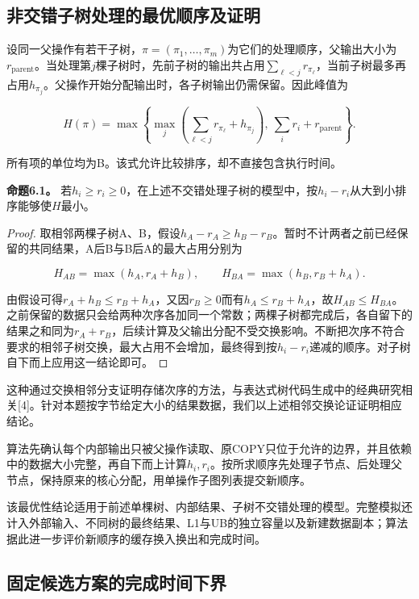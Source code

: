 \documentclass[anonymous,notoc]{gmcm2026}
\begin{document}
\subsection{非交错子树处理的最优顺序及证明}

设同一父操作有若干子树，\(\pi=(\pi_1,\ldots,\pi_m)\)为它们的处理顺序，父输出大小为\(r_{\mathrm{parent}}\)。当处理第\(j\)棵子树时，先前子树的输出共占用\(\sum_{\ell<j}r_{\pi_\ell}\)，当前子树最多再占用\(h_{\pi_j}\)。父操作开始分配输出时，各子树输出仍需保留。因此峰值为

\[H(\pi)=\max\left\{\max_j\left(\sum_{\ell<j}r_{\pi_\ell}+h_{\pi_j}\right),\ \sum_i r_i+r_{\mathrm{parent}}\right\}.\]

所有项的单位均为B。该式允许比较排序，却不直接包含执行时间。

\textbf{命题6.1。} 若\(h_i\ge r_i\ge0\)，在上述不交错处理子树的模型中，按\(h_i-r_i\)从大到小排序能够使\(H\)最小。

\begin{proof} 取相邻两棵子树A、B，假设\(h_A-r_A\ge h_B-r_B\)。暂时不计两者之前已经保留的共同结果，A后B与B后A的最大占用分别为

\[H_{AB}=\max(h_A,r_A+h_B),\qquad H_{BA}=\max(h_B,r_B+h_A).\]

由假设可得\(r_A+h_B\le r_B+h_A\)，又因\(r_B\ge0\)而有\(h_A\le r_B+h_A\)，故\(H_{AB}\le H_{BA}\)。之前保留的数据只会给两种次序各加同一个常数；两棵子树都完成后，各自留下的结果之和同为\(r_A+r_B\)，后续计算及父输出分配不受交换影响。不断把次序不符合要求的相邻子树交换，最大占用不会增加，最终得到按\(h_i-r_i\)递减的顺序。对子树自下而上应用这一结论即可。\end{proof}

这种通过交换相邻分支证明存储次序的方法，与表达式树代码生成中的经典研究相关{[}4{]}。针对本题按字节给定大小的结果数据，我们以上述相邻交换论证证明相应结论。

算法先确认每个内部输出只被父操作读取、原COPY只位于允许的边界，并且依赖中的数据大小完整，再自下而上计算\(h_i,r_i\)。按所求顺序先处理子节点、后处理父节点，保持原来的核心分配，用单操作子图列表提交新顺序。

该最优性结论适用于前述单棵树、内部结果、子树不交错处理的模型。完整模拟还计入外部输入、不同树的最终结果、L1与UB的独立容量以及新建数据副本；算法据此进一步评价新顺序的缓存换入换出和完成时间。

\subsection{固定候选方案的完成时间下界}
\end{document}
